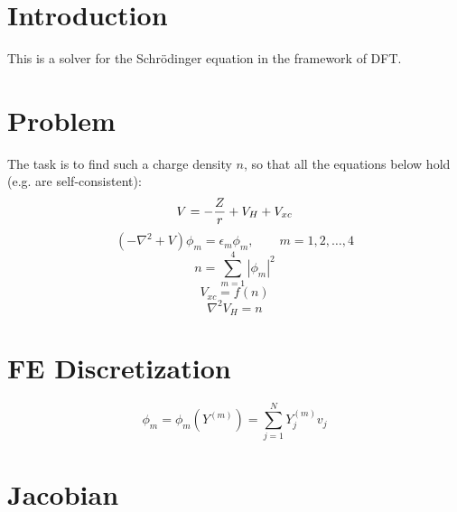 \documentclass[11pt]{article}
\begin{document}
\section{Introduction}

This is a solver for the Schr\"odinger equation in the framework of DFT.

\section{Problem}

The task is to find such a charge density $n$, so that all the equations below hold (e.g. are
self-consistent):
$$ V = -{Z\over r} + V_H + V_{xc} $$
$$
\left(-\nabla^2+V\right)\phi_m = \epsilon_m\phi_m,\quad\quad m = 1, 2, \dots, 4
$$
$$ n = \sum_{m=1}^4 |\phi_m|^2 $$
$$ V_{xc} = f(n) $$
$$ \nabla^2 V_H = n $$

\section{FE Discretization}

$$\phi_m = \phi_m(Y^{(m)}) = \sum_{j=1}^N Y_j^{(m)} v_j$$

\section{Jacobian}
\end{document}
